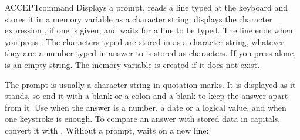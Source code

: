 \begin{XbaseEntry}{ACCEPT}{command}
Displays a prompt, reads a line typed at the keyboard and stores it in a
memory variable as a character string.
\Syntax
{}
\Usage
{} displays the character expression , if one is given, and
waits for a line to be typed.  The line ends when you press .  The
characters typed are stored in  as a character string, whatever
they are: a number typed in answer to  is stored as characters.  If
you press  alone,  is an empty string.  The memory
variable is created if it does not exist.

The prompt is usually a character string in quotation marks.  It is displayed
as it stands, so end it with a blank or a colon and a blank to keep the answer
apart from it.
\Tips
Use  when the answer is a number, a date or a logical value, and
 when one keystroke is enough.  To compare an answer with stored
data in capitals, convert it with .
\Examples
{}
Without a prompt,  waits on a new line:
\end{XbaseEntry}

